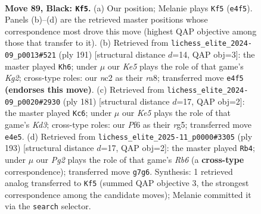 \documentclass[11pt]{article}
\begin{document}
\clearpage

\begin{figure}[p]\centering
\begin{subfigure}{0.46\textwidth}\centering
\resizebox{\linewidth}{!}{%
\newchessgame
\chessboard[
  setfen={8/3r2p1/5p2/7p/4k2P/6P1/1RN5/7K b - - 3 89},
  showmover=false,
  pgfstyle=straightmove, color=movearrow, markmove={e4-f5}
]}
\caption{}
\end{subfigure}\hfill
\begin{subfigure}{0.46\textwidth}\centering
\resizebox{\linewidth}{!}{%
\newchessgame
\chessboard[
  setfen={R7/6k1/6p1/7p/7P/5PP1/1r6/5K2 b - - 2 96},
  showmover=false,
  pgfstyle=straightmove, color=movearrow, markmove={g7-h6}
]}
\caption{}
\end{subfigure}
\\[4pt]
\begin{subfigure}{0.46\textwidth}\centering
\resizebox{\linewidth}{!}{%
\newchessgame
\chessboard[
  setfen={8/1p6/pN1k4/P5R1/8/1K6/8/2r5 b - - 22 91},
  showmover=false,
  pgfstyle=straightmove, color=movearrow, markmove={d6-c6}
]}
\caption{}
\end{subfigure}\hfill
\begin{subfigure}{0.46\textwidth}\centering
\resizebox{\linewidth}{!}{%
\newchessgame
\chessboard[
  setfen={6k1/6p1/7p/R6P/6P1/1r6/5K2/8 b - - 50 97},
  showmover=false,
  pgfstyle=straightmove, color=movearrow, markmove={b3-b4}
]}
\caption{}
\end{subfigure}
\caption{\textbf{Move 89, Black: \texttt{Kf5}.} (a) Our position; Melanie plays \texttt{Kf5} (\texttt{e4f5}). Panels (b)--(d) are the retrieved master positions whose correspondence most drove this move (highest QAP objective among those that transfer to it). (b) Retrieved from \texttt{lichess\_elite\_2024-09\_p0013\#521} (ply 191) [structural distance $d$=14, QAP obj=3]: the master played \texttt{Kh6}; under $\mu$ our \emph{Ke5} plays the role of that game's \emph{Kg2}; cross-type roles: our \emph{n}c2 as their \emph{r}a8; transferred move \texttt{e4f5} \textbf{(endorses this move)}. (c) Retrieved from \texttt{lichess\_elite\_2024-09\_p0020\#2930} (ply 181) [structural distance $d$=17, QAP obj=2]: the master played \texttt{Kc6}; under $\mu$ our \emph{Ke5} plays the role of that game's \emph{Kd3}; cross-type roles: our \emph{P}f6 as their \emph{r}g5; transferred move \texttt{e4e5}. (d) Retrieved from \texttt{lichess\_elite\_2025-11\_p0000\#3305} (ply 193) [structural distance $d$=17, QAP obj=2]: the master played \texttt{Rb4}; under $\mu$ our \emph{Pg2} plays the role of that game's \emph{Rb6} (a \textbf{cross-type} correspondence); transferred move \texttt{g7g6}. Synthesis: 1 retrieved analog transferred to \texttt{Kf5} (summed QAP objective 3, the strongest correspondence among the candidate moves); Melanie committed it via the \texttt{search} selector.}
\label{fig:thought-m177}
\end{figure}
\end{document}
